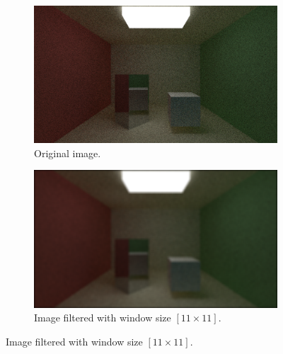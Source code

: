 \documentclass[titlepage,12pt]{report}
\begin{document}
\begin{figure}[H]
	\centering
	\begin{subfigure}{.48\textwidth}
		\centering
		\includegraphics[scale=0.2]{media/cornell_normal_50.png}
		\caption{Original image.}
		\label{mean_filter_5}
	\end{subfigure}
	\begin{subfigure}{.48\textwidth}
		\centering
		\includegraphics[scale=0.2]{media/mean/cornell_normal_50_mean_filter_11.png}
		\caption{Image filtered with window size $[11 \times 11]$.}
		\label{mean_filter_6}
	\end{subfigure}


\end{figure}
\end{document}
